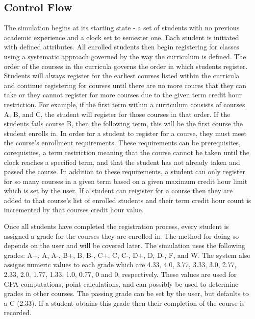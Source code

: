 \documentclass[botnum, fleqn]{unmeethesis}
\begin{document}
\subsection{Control Flow}
The simulation begins at its starting state - a set of students with no previous academic experience and a clock set to semester one. Each student is initiated with defined attributes. All enrolled students then begin registering for classes using a systematic approach governed by the way the curriculum is defined. The order of the courses in the curricula governs the order in which students register. Students will always register for the earliest courses listed within the curricula and continue registering for courses until there are no more coures that they can take or they cannot register for more courses due to the given term credit hour restriction. For example, if the first term within a curriculum consists of courses A, B, and C, the student will register for those courses in that order. If the students fails course B, then the following term, this will be the first course the student enrolls in. In order for a student to register for a course, they must meet the course's enrollment requirements. These requirements can be prerequisites, corequisties, a term restriction meaning that the course cannot be taken until the clock reaches a specified term, and that the student has not already taken and passed the course. In addition to these requirements, a student can only register for so many courses in a given term based on a given maximum credit hour limit which is set by the user. If a student can reigister for a course then they are added to that course's list of enrolled students and their term credit hour count is incremented by that courses credit hour value. 

Once all students have completed the registration process, every student is assigned a grade for the courses they are enrolled in. The method for doing so depends on the user and will be covered later. The simulation uses the following grades: A+, A, A-, B+, B, B-, C+, C, C-, D+, D, D-, F, and W. The system also assigns numeric values to each grade which are 4.33, 4.0, 3.77, 3.33, 3.0, 2.77, 2.33, 2.0, 1.77, 1.33, 1.0, 0.77, 0 and 0, respectively. These values are used for GPA computations, point calculations, and can possibly be used to determine grades in other courses. The passing grade can be set by the user, but defaults to a C (2.33). If a student obtains this grade then their completion of the course is recorded.
\end{document}
